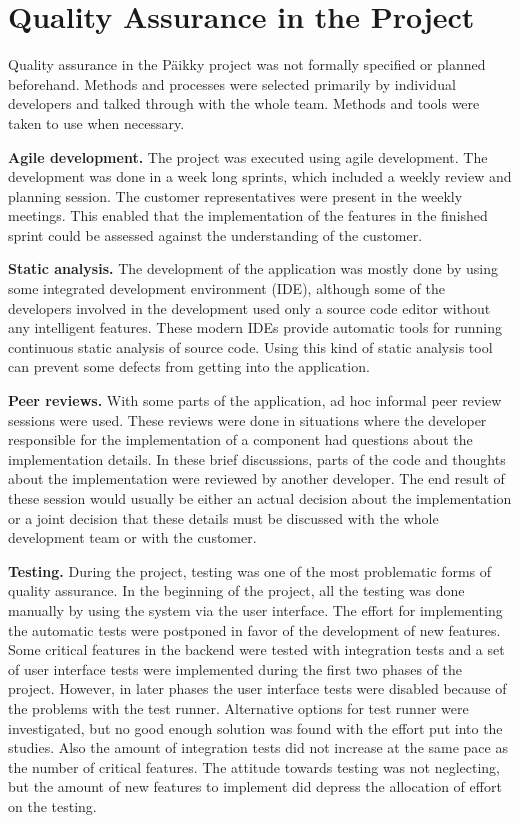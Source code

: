 
 \section{Quality Assurance in the Project}
\label{sec:qa_case}

Quality assurance in the Päikky project was not formally specified or planned beforehand. Methods and processes were selected primarily by individual developers and talked through with the whole team. Methods and tools were taken to use when necessary.

\textbf{Agile development.} The project was executed using agile development. The development was done in a week long sprints, which included a weekly review and planning session. The customer representatives were present in the weekly meetings. This enabled that the implementation of the features in the finished sprint could be assessed against the understanding of the customer. 

\textbf{Static analysis.} The development of the application was mostly done by using some integrated development environment (IDE), although some of the developers involved in the development used only a source code editor without any intelligent features. These modern IDEs provide automatic tools for running continuous static analysis of source code. Using this kind of static analysis tool can prevent some defects from getting into the application. 

\textbf{Peer reviews.} With some parts of the application, ad hoc informal peer review sessions were used. These reviews were done in situations where the developer responsible for the implementation of a component had questions about the implementation details. In these brief discussions, parts of the code and thoughts about the implementation were reviewed by another developer. The end result of these session would usually be either an actual decision about the implementation or a joint decision that these details must be discussed with the whole development team or with the customer.

\textbf{Testing.} During the project, testing was one of the most problematic forms of quality assurance. In the beginning of the project, all the testing was done manually by using the system via the user interface. The effort for implementing the automatic tests were postponed in favor of the development of new features. Some critical features in the backend were tested with integration tests and a set of user interface tests were implemented during the first two phases of the project. However, in later phases the user interface tests were disabled because of the problems with the test runner. Alternative options for test runner were investigated, but no good enough solution was found with the effort put into the studies. Also the amount of integration tests did not increase at the same pace as the number of critical features. The attitude towards testing was not neglecting, but the amount of new features to implement did depress the allocation of effort on the testing.

